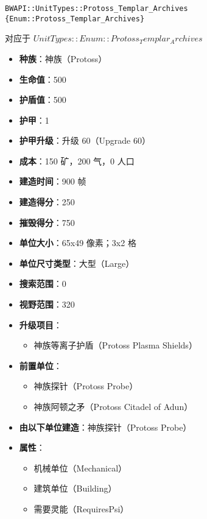 \begin{tcolorbox}[colback=white, colframe=black!60!white, title=Protoss\_Templar\_Archives(), arc=0mm]
    \begin{verbatim}
BWAPI::UnitTypes::Protoss_Templar_Archives {Enum::Protoss_Templar_Archives}
    \end{verbatim}
    对应于  $ UnitTypes::Enum::Protoss_Templar_Archives $ 
    \begin{itemize}
        \item \textbf{种族}：神族（Protoss）
        \item \textbf{生命值}：500
        \item \textbf{护盾值}：500
        \item \textbf{护甲}：1
        \item \textbf{护甲升级}：升级 60（Upgrade 60）
        \item \textbf{成本}：150 矿，200 气，0 人口
        \item \textbf{建造时间}：900 帧
        \item \textbf{建造得分}：250
        \item \textbf{摧毁得分}：750
        \item \textbf{单位大小}：65x49 像素；3x2 格
        \item \textbf{单位尺寸类型}：大型（Large）
        \item \textbf{搜索范围}：0
        \item \textbf{视野范围}：320
        \item \textbf{升级项目}：
            \begin{itemize}
                \item 神族等离子护盾（Protoss Plasma Shields）
            \end{itemize}
        \item \textbf{前置单位}：
            \begin{itemize}
                \item 神族探针（Protoss Probe）
                \item 神族阿顿之矛（Protoss Citadel of Adun）
            \end{itemize}
        \item \textbf{由以下单位建造}：神族探针（Protoss Probe）
        \item \textbf{属性}：
            \begin{itemize}
                \item 机械单位（Mechanical）
                \item 建筑单位（Building）
                \item 需要灵能（RequiresPsi）
            \end{itemize}
    \end{itemize}
\end{tcolorbox}

